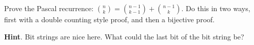 \documentclass{book}
\begin{document}
\setcounter{cpjt}{99}
\addtocounter{cpjt}{-1}
\begin{activity}\label{activity-92}
\hypertarget{p-698}{}%
Prove the Pascal recurrence: \(\binom{n}{k} = \binom{n - 1}{k-1} + \binom{n - 1}{k}\).  Do this in two ways, first with a double counting style proof, and then a bijective proof.%
\par\smallskip%
\noindent\textbf{Hint}.\hypertarget{hint-53}{}\quad%
\hypertarget{p-699}{}%
Bit strings are nice here.  What could the last bit of the bit string be?%
\par\smallskip%
\noindent\end{activity}

\clearpage
\end{document}
